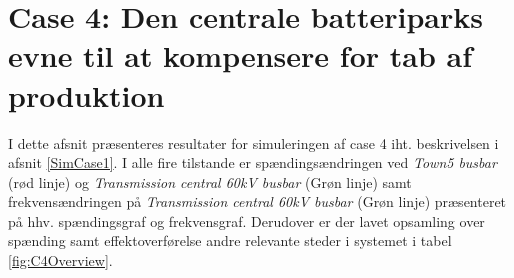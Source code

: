 
\section{Case 4: Den centrale batteriparks evne til at kompensere for tab af produktion}
I dette afsnit præsenteres resultater for simuleringen af case 4 iht. beskrivelsen i afsnit \ref{SimCase1}. I alle fire tilstande er spændingsændringen ved \textit{Town5 busbar} (rød linje) og \textit{Transmission central 60kV busbar} (Grøn linje) samt frekvensændringen på \textit{Transmission central 60kV busbar} (Grøn linje) præsenteret på hhv. spændingsgraf og frekvensgraf. Derudover er der lavet opsamling over spænding samt effektoverførelse andre relevante steder i systemet i tabel \ref{fig:C4Overview}. \\ \\

